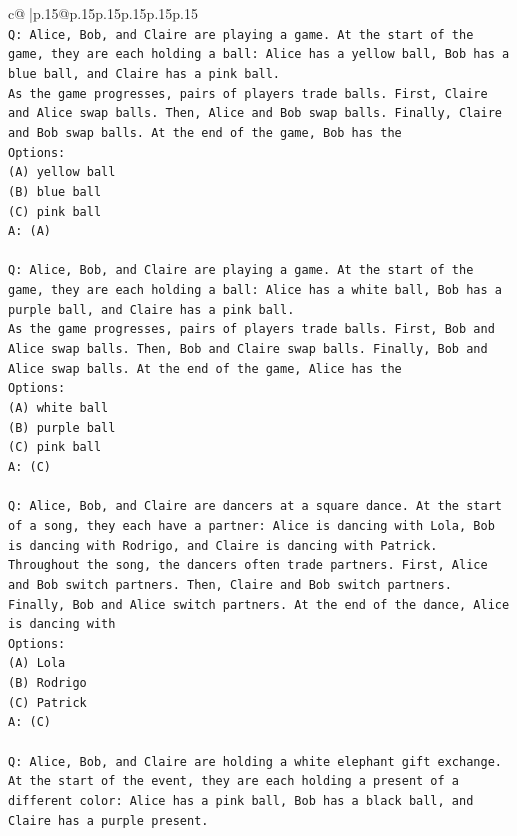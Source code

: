 \documentclass{article}
\begin{document}
{\begin{supertabular}{c@{$\;$}|p{.15\linewidth}@{}p{.15\linewidth}p{.15\linewidth}p{.15\linewidth}p{.15\linewidth}p{.15\linewidth}}
{{{\\ 
\texttt{Q: Alice, Bob, and Claire are playing a game. At the start of the game, they are each holding a ball: Alice has a yellow ball, Bob has a blue ball, and Claire has a pink ball.} \\
\texttt{As the game progresses, pairs of players trade balls. First, Claire and Alice swap balls. Then, Alice and Bob swap balls. Finally, Claire and Bob swap balls. At the end of the game, Bob has the} \\
\texttt{Options:} \\
\texttt{(A) yellow ball} \\
\texttt{(B) blue ball} \\
\texttt{(C) pink ball} \\
\texttt{A: (A)} \\
\\ 
\texttt{Q: Alice, Bob, and Claire are playing a game. At the start of the game, they are each holding a ball: Alice has a white ball, Bob has a purple ball, and Claire has a pink ball.} \\
\texttt{As the game progresses, pairs of players trade balls. First, Bob and Alice swap balls. Then, Bob and Claire swap balls. Finally, Bob and Alice swap balls. At the end of the game, Alice has the} \\
\texttt{Options:} \\
\texttt{(A) white ball} \\
\texttt{(B) purple ball} \\
\texttt{(C) pink ball} \\
\texttt{A: (C)} \\
\\ 
\texttt{Q: Alice, Bob, and Claire are dancers at a square dance. At the start of a song, they each have a partner: Alice is dancing with Lola, Bob is dancing with Rodrigo, and Claire is dancing with Patrick.} \\
\texttt{Throughout the song, the dancers often trade partners. First, Alice and Bob switch partners. Then, Claire and Bob switch partners. Finally, Bob and Alice switch partners. At the end of the dance, Alice is dancing with} \\
\texttt{Options:} \\
\texttt{(A) Lola} \\
\texttt{(B) Rodrigo} \\
\texttt{(C) Patrick} \\
\texttt{A: (C)} \\
\\ 
\texttt{Q: Alice, Bob, and Claire are holding a white elephant gift exchange. At the start of the event, they are each holding a present of a different color: Alice has a pink ball, Bob has a black ball, and Claire has a purple present.} \\
}}}
\end{supertabular}}
\end{document}
